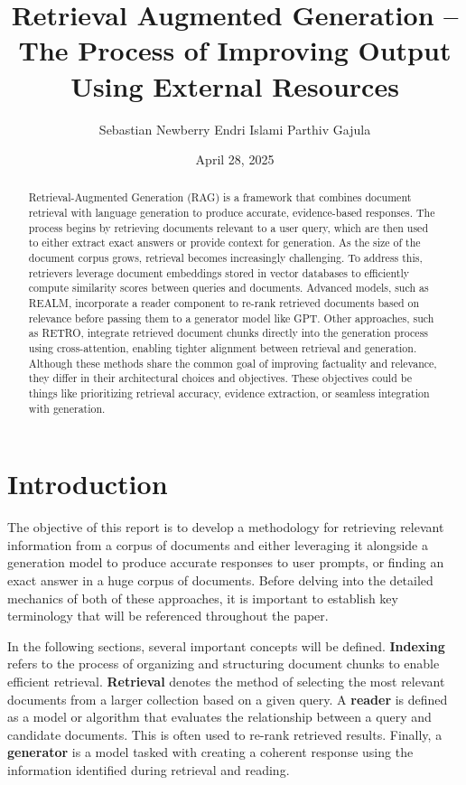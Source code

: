 \documentclass[twocolumn, 10pt]{article}
\title{Retrieval Augmented Generation – The Process of Improving Output Using External Resources}
\author{Sebastian Newberry \quad Endri Islami \quad Parthiv Gajula}
\date{April 28, 2025}
\begin{document}
\setlength{\abovedisplayskip}{6pt}
\setlength{\belowdisplayskip}{6pt}

\maketitle

\begin{abstract}
    Retrieval-Augmented Generation (RAG) is a framework that combines document retrieval with language generation to produce accurate, evidence-based responses. The process begins by retrieving documents relevant to a user query, which are then used to either extract exact answers or provide context for generation. As the size of the document corpus grows, retrieval becomes increasingly challenging. To address this, retrievers leverage document embeddings stored in vector databases to efficiently compute similarity scores between queries and documents. Advanced models, such as REALM, incorporate a reader component to re-rank retrieved documents based on relevance before passing them to a generator model like GPT. Other approaches, such as RETRO, integrate retrieved document chunks directly into the generation process using cross-attention, enabling tighter alignment between retrieval and generation. Although these methods share the common goal of improving factuality and relevance, they differ in their architectural choices and objectives. These objectives could be things like prioritizing retrieval accuracy, evidence extraction, or seamless integration with generation.
\end{abstract}

\section{Introduction}

The objective of this report is to develop a methodology for retrieving relevant information from a corpus of documents and either leveraging it alongside a generation model to produce accurate responses to user prompts, or finding an exact answer in a huge corpus of documents. Before delving into the detailed mechanics of both of these approaches, it is important to establish key terminology that will be referenced throughout the paper.

In the following sections, several important concepts will be defined. \textbf{Indexing} refers to the process of organizing and structuring document chunks to enable efficient retrieval. \textbf{Retrieval} denotes the method of selecting the most relevant documents from a larger collection based on a given query. A \textbf{reader} is defined as a model or algorithm that evaluates the relationship between a query and candidate documents. This is often used to re-rank retrieved results. Finally, a \textbf{generator} is a model tasked with creating a coherent response using the information identified during retrieval and reading.
\end{document}
